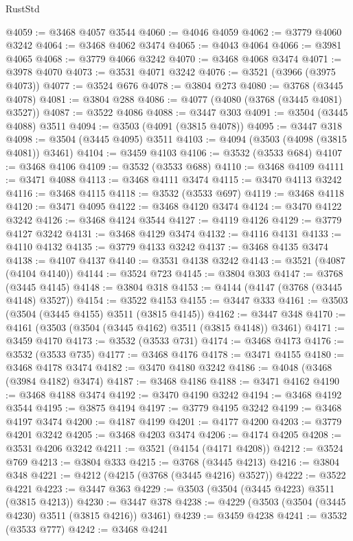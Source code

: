 \begin{lexlean}{RustStd}
\begin{coremodule}
@4059 := @3468 @4057 @3544
@4060 := @4046 @4059
@4062 := @3779 @4060 @3242
@4064 := @3468 @4062 @3474
@4065 := @4043 @4064
@4066 := @3981 @4065
@4068 := @3779 @4066 @3242
@4070 := @3468 @4068 @3474
@4071 := @3978 @4070
@4073 := @3531 @4071 @3242
@4076 := @3521 (@3966 (@3975 @4073))
@4077 := @3524 @676
@4078 := @3804 @273
@4080 := @3768 (@3445 @4078)
@4081 := @3804 @288
@4086 := @4077 (@4080 (@3768 (@3445 @4081) @3527))
@4087 := @3522 @4086
@4088 := @3447 @303
@4091 := @3504 (@3445 @4088) @3511
@4094 := @3503 (@4091 (@3815 @4078))
@4095 := @3447 @318
@4098 := @3504 (@3445 @4095) @3511
@4103 := @4094 (@3503 (@4098 (@3815 @4081)) @3461)
@4104 := @3459 @4103
@4106 := @3532 (@3533 @684)
@4107 := @3468 @4106
@4109 := @3532 (@3533 @688)
@4110 := @3468 @4109
@4111 := @3471 @4088
@4113 := @3468 @4111 @3474
@4115 := @3470 @4113 @3242
@4116 := @3468 @4115
@4118 := @3532 (@3533 @697)
@4119 := @3468 @4118
@4120 := @3471 @4095
@4122 := @3468 @4120 @3474
@4124 := @3470 @4122 @3242
@4126 := @3468 @4124 @3544
@4127 := @4119 @4126
@4129 := @3779 @4127 @3242
@4131 := @3468 @4129 @3474
@4132 := @4116 @4131
@4133 := @4110 @4132
@4135 := @3779 @4133 @3242
@4137 := @3468 @4135 @3474
@4138 := @4107 @4137
@4140 := @3531 @4138 @3242
@4143 := @3521 (@4087 (@4104 @4140))
@4144 := @3524 @723
@4145 := @3804 @303
@4147 := @3768 (@3445 @4145)
@4148 := @3804 @318
@4153 := @4144 (@4147 (@3768 (@3445 @4148) @3527))
@4154 := @3522 @4153
@4155 := @3447 @333
@4161 := @3503 (@3504 (@3445 @4155) @3511 (@3815 @4145))
@4162 := @3447 @348
@4170 := @4161 (@3503 (@3504 (@3445 @4162) @3511 (@3815 @4148)) @3461)
@4171 := @3459 @4170
@4173 := @3532 (@3533 @731)
@4174 := @3468 @4173
@4176 := @3532 (@3533 @735)
@4177 := @3468 @4176
@4178 := @3471 @4155
@4180 := @3468 @4178 @3474
@4182 := @3470 @4180 @3242
@4186 := @4048 (@3468 (@3984 @4182) @3474)
@4187 := @3468 @4186
@4188 := @3471 @4162
@4190 := @3468 @4188 @3474
@4192 := @3470 @4190 @3242
@4194 := @3468 @4192 @3544
@4195 := @3875 @4194
@4197 := @3779 @4195 @3242
@4199 := @3468 @4197 @3474
@4200 := @4187 @4199
@4201 := @4177 @4200
@4203 := @3779 @4201 @3242
@4205 := @3468 @4203 @3474
@4206 := @4174 @4205
@4208 := @3531 @4206 @3242
@4211 := @3521 (@4154 (@4171 @4208))
@4212 := @3524 @769
@4213 := @3804 @333
@4215 := @3768 (@3445 @4213)
@4216 := @3804 @348
@4221 := @4212 (@4215 (@3768 (@3445 @4216) @3527))
@4222 := @3522 @4221
@4223 := @3447 @363
@4229 := @3503 (@3504 (@3445 @4223) @3511 (@3815 @4213))
@4230 := @3447 @378
@4238 := @4229 (@3503 (@3504 (@3445 @4230) @3511 (@3815 @4216)) @3461)
@4239 := @3459 @4238
@4241 := @3532 (@3533 @777)
@4242 := @3468 @4241

\end{coremodule}
\end{lexlean}
